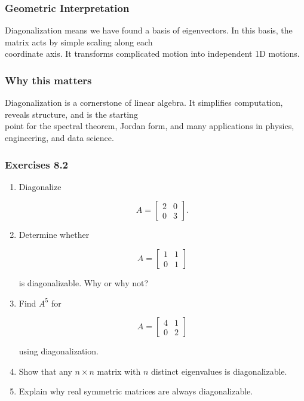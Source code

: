 \documentclass[
  12pt,
  a4paper,
]{article}
\begin{document}
\subsubsection{Geometric
Interpretation}\label{geometric-interpretation-17}

Diagonalization means we have found a basis of eigenvectors. In this
basis, the matrix acts by simple scaling along each\\
coordinate axis. It transforms complicated motion into independent 1D
motions.

\subsubsection{Why this matters}\label{why-this-matters-29}

Diagonalization is a cornerstone of linear algebra. It simplifies
computation, reveals structure, and is the starting\\
point for the spectral theorem, Jordan form, and many applications in
physics, engineering, and data science.

\subsubsection{Exercises 8.2}\label{exercises-82}

\begin{enumerate}
\def\labelenumi{\arabic{enumi}.}
\item
  Diagonalize

  \[A = \begin{bmatrix} 2 & 0 \\ 0 & 3 \end{bmatrix}.\]
\item
  Determine whether

  \[A = \begin{bmatrix} 1 & 1 \\ 0 & 1 \end{bmatrix}\]

  is diagonalizable. Why or why not?
\item
  Find \(A^5\) for

  \[A = \begin{bmatrix} 4 & 1 \\ 0 & 2 \end{bmatrix}\]

  using diagonalization.
\item
  Show that any \(n \times n\) matrix with \(n\) distinct eigenvalues is
  diagonalizable.
\item
  Explain why real symmetric matrices are always diagonalizable.
\end{enumerate}
\end{document}
